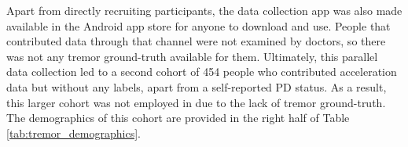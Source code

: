 \documentclass[journal,twoside,web]{ieeecolor}
\begin{document}
Apart from directly recruiting participants, the data collection app was also
made available in the Android app store for anyone to download and use. People
that contributed data through that channel were not examined by doctors, so
there was not any tremor ground-truth available for them.  Ultimately, this
parallel data collection  led to a second cohort of 454 people who contributed
acceleration data  but without any labels, apart from a self-reported PD status.
As a result, this larger cohort was not employed in \cite{alpapado2019tremor}
due to the lack of tremor ground-truth. The demographics of this cohort are
provided in the right half of Table \ref{tab:tremor_demographics}.


\begin{table}[!h]
	\centering
	\caption{Instance embedding transformation $\phi$
		and classification head $\rho$. $k$
		denotes the kernel size, $f$ the number of filters, 
		$s$ the stride and $M$ the embedding dimension.}
	\label{tab:pd_arch}
\end{table}
\end{document}
